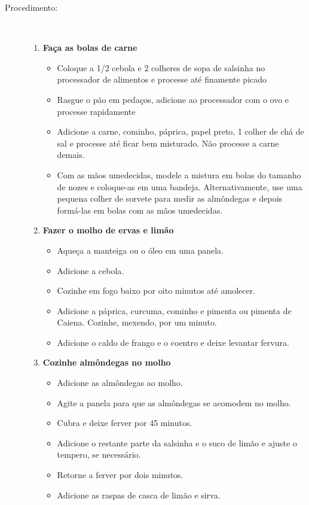 \documentclass [11pt, papel de carta] {article}
\begin{document}
\begin {description}
\item [Procedimento:] \ \\
\begin {enumerate}
\item {\bf Faça as bolas de carne}
\begin {itemize}
\item Coloque a 1/2 cebola e 2 colheres de sopa de salsinha no processador de alimentos e processe até finamente picado
\item Rasgue o pão em pedaços, adicione ao processador com o ovo e processe rapidamente
\item Adicione a carne, cominho, páprica, papel preto, 1 colher de chá de sal e processe até ficar bem misturado. Não processe a carne demais.
\item Com as mãos umedecidas, modele a mistura em bolas do tamanho de nozes e coloque-as em uma bandeja. Alternativamente, use uma pequena colher de sorvete para medir as almôndegas e depois formá-las em bolas com as mãos umedecidas.
\end {itemize}
\item {\bf Fazer o molho de ervas e limão}
\begin {itemize}
\item Aqueça a manteiga ou o óleo em uma panela.
\item Adicione a cebola.
\item Cozinhe em fogo baixo por oito minutos até amolecer.
\item Adicione a páprica, curcuma, cominho e pimenta ou pimenta de Caiena.
Cozinhe, mexendo, por um minuto.
\item Adicione o caldo de frango e o coentro e deixe levantar fervura.
\end {itemize}
\item {\bf Cozinhe almôndegas no molho}
\begin {itemize}
\item Adicione as almôndegas ao molho.
\item Agite a panela para que as almôndegas se acomodem no molho.
\item Cubra e deixe ferver por 45 minutos.
\item Adicione o restante  parte da salsinha e o suco de limão e ajuste o tempero, se necessário.
\item Retorne a ferver por dois minutos.
\item Adicione as raspas de casca de limão e sirva.
\end {itemize}
\end {enumerate}
\end {description}
\end{document}
